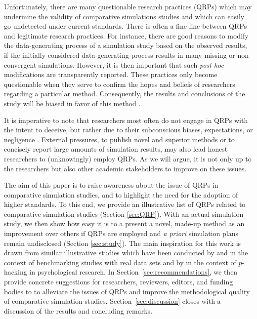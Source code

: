 \documentclass[a4paper, 11pt]{article}
\begin{document}
Unfortunately, there are many questionable research practices (QRPs) which may
undermine the validity of comparative simulations studies and which can easily
go undetected under current standards. There is often a fine line between QRPs and
legitimate research practices. For instance, there are good reasons to modify the data-generating 
process of a simulation study based on the observed results, \eg if the initially 
considered data-generating process results in many missing or non-convergent simulations.
However, it is then important that such \emph{post hoc} modifications are transparently
reported. These practices only become questionable when they serve to confirm the hopes 
and beliefs of researchers regarding a particular method. Consequently, the results and 
conclusions of the study will be biased in favor of this method \citep{Niessl2021}.

It is imperative to note that researchers most often do not engage in QRPs 
with the intent to deceive, but rather due to their subconscious biases,
expectations, or negligence \citep{Simmons2011}.
External pressures, \eg to publish novel and superior methods
\citep{Boulesteix2015} or to concisely report large amounts of simulation
results, may also lead honest researchers to (unknowingly) employ QRPs.
As we will argue, it is not only up to the researchers but also other academic stakeholders
to improve on these issues. 

The aim of this paper is to raise awareness about the issue of QRPs in comparative
simulation studies, and to highlight the need for the adoption of higher standards. 
To this end, we provide an illustrative list of QRPs
related to comparative simulation studies (Section \ref{sec:QRP}). With an
actual simulation study, we then show how easy it is to a present a novel,
made-up method as an improvement over others if QRPs are employed and 
\emph{a priori} simulation plans remain undisclosed (Section \ref{sec:study}).
The main inspiration for this work is drawn from similar illustrative studies which have
been conducted by \citet{Niessl2021} and \citet{Jelizarow2010} in the context
of benchmarking studies with real data sets and by
\citet{Simmons2011} in the context of $p$-hacking in psychological research.
In Section~\ref{sec:recommendations}, we then provide concrete
suggestions for researchers, reviewers, editors, and funding bodies to
to alleviate the issues of QRPs and improve the methodological quality of 
comparative simulation studies.
Section~\ref{sec:discussion} closes with a discussion of the results and 
concluding remarks.
\end{document}
